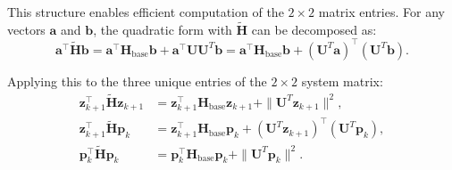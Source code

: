 \documentclass[acmtog,anonymous,review,screen,nonacm]{acmart}
\begin{document}
This structure enables efficient computation of the $2 \times 2$ matrix entries. For any vectors $\mathbf{a}$ and $\mathbf{b}$, the quadratic form with $\tilde{\mathbf{H}}$ can be decomposed as:
\begin{equation}
    \mathbf{a}^\top \tilde{\mathbf{H}} \mathbf{b} = \mathbf{a}^\top \mathbf{H}_{\text{base}} \mathbf{b} + \mathbf{a}^\top \mathbf{U} \mathbf{U}^T \mathbf{b} = \mathbf{a}^\top \mathbf{H}_{\text{base}} \mathbf{b} + (\mathbf{U}^T \mathbf{a})^\top (\mathbf{U}^T \mathbf{b}).
\end{equation}

Applying this to the three unique entries of the $2 \times 2$ system matrix:
\begin{align}
    \mathbf{z}_{k+1}^\top \tilde{\mathbf{H}} \mathbf{z}_{k+1} &= \mathbf{z}_{k+1}^\top \mathbf{H}_{\text{base}} \mathbf{z}_{k+1} + \| \mathbf{U}^T \mathbf{z}_{k+1} \|^2, \label{eq:entry_zz} \\
    \mathbf{z}_{k+1}^\top \tilde{\mathbf{H}} \mathbf{p}_k &= \mathbf{z}_{k+1}^\top \mathbf{H}_{\text{base}} \mathbf{p}_k + (\mathbf{U}^T \mathbf{z}_{k+1})^\top (\mathbf{U}^T \mathbf{p}_k), \label{eq:entry_zp} \\
    \mathbf{p}_k^\top \tilde{\mathbf{H}} \mathbf{p}_k &= \mathbf{p}_k^\top \mathbf{H}_{\text{base}} \mathbf{p}_k + \| \mathbf{U}^T \mathbf{p}_k \|^2. \label{eq:entry_pp}
\end{align}
\end{document}
